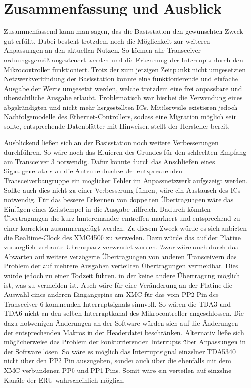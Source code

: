 \chapter{Zusammenfassung und Ausblick}
\label{sec:Zusammenfassung}
\pagestyle{scrheadings}
Zusammenfassend kann man sagen, das die Basisstation den gewünschten Zweck gut erfüllt. Dabei besteht trotzdem noch die Möglichkeit zur weiteren Anpassungen an den aktuellen Nutzen. So können alle Transceiver ordnungsgemäß angesteuert werden und die Erkennung der Interrupts durch den Mikrocontroller funktioniert. Trotz der zum jetzigen Zeitpunkt nicht umgesetzten Netzwerkverbindung der Basisstation konnte eine funktionierende und einfache Ausgabe der Werte umgesetzt werden, welche trotzdem eine frei anpassbare und übersichtliche Ausgabe erlaubt. Problematisch war hierbei die Verwendung eines abgekündigten und nicht mehr hergestellten \acp{IC}. Mittlerweile existieren jedoch Nachfolgemodelle des Ethernet-Controllers, sodass eine Migration möglich sein sollte, entsprechende Datenblätter mit Hinweisen stellt der Hersteller bereit. 





Ausblickend ließen sich an der Basisstation noch weitere Verbesserungen durchführen.
So wäre noch das Eruieren des Grundes für den schlechten Empfang am Transceiver $3$ notwendig. Dafür könnte durch das Anschließen eines Signalgenerators an die Antennenbuchse der entsprechenden Transceiverbaugruppe ein möglicher Fehler im Anpassnetzwerk aufgezeigt werden. Sollte auch dies nicht zu einer Verbesserung führen, wäre ein Austausch des \acp{IC} notwendig.
Für das bessere Erkennen von doppelten Übertragungen wäre das Einfügen eines Zeitstempel in die Ausgabe hilfreich. Dadurch könnten Übertragungen die kurz hintereinander eintreffen markiert und entsprechend zu einer korrekten zusammengefügt werden. Zu diesem Zweck würde es sich anbieten die Realtime-Clock des XMC4500 zu verweden. Dazu würde das auf der Platine vorsorglich verbaute Uhrenquarz verwendet werden. Zwar wäre auch durch das Abwarten auf weitere verzögerte Übertragungen von anderen Transceivern das Problem der auf mehrere Ausgaben verteilten Übertragungen vermeidbar. Dies würde jedoch zu einer Todzeit führen, in der keine andere Übertragung möglich ist, was zu vermeiden ist.
Auch wäre für eine Veränderung an der Platine die Auswahl eines anderen Eingangspins am XMC für das vom PP2 Pin des Transceiver 6 kommenden Interruptsignals sinnvoll. So wären die TDA3 und TDA6 nicht an den selben Interruptkanal des Mikrocontroller angeschlossen. Die dazu notwenigen Änderungen an der Software würden sich auf die Änderungen der entsprechenden Makros in der Headerdatei beschränken.
Alternativ ließe sich möglicherweise das Problem der konkurrierenden Interrupts über Anpassungen in der Software lösen. So wäre es möglich das Interruptsignal einzelner TDA5340 nicht über den PP2 Pin auszugeben, sonder auch über die ebenfalls mit dem XMC verbundenen PP0 und PP1 Pins. Somit wäre ein verteilen auf einzelne Kanäle der \ac{ERU} wahrscheinlich möglich.


